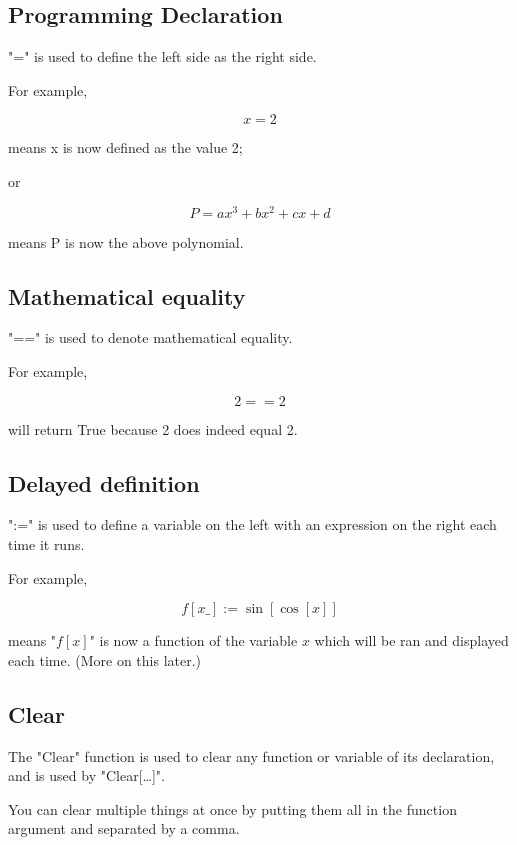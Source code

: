 \documentclass[11pt,letterpaper,twoside,titlepage]{report}
\begin{document}
					\subsection{Programming Declaration} %
					
						"=" is used to define the left side as the right side.
					
						For example, 
					
						\[ x = 2 \]
					
						means x is now defined as the value 2;
					
						or
					
						\[ P = ax^3 + bx^2 + cx + d \]
					
						means P is now the above polynomial.
						
					\subsection{Mathematical equality} %
					
						"==" is used to denote mathematical equality.
						
						For example,
						
						\[ 2 == 2 \]
							
						will return True because 2 does indeed equal 2.
						
					\subsection{Delayed definition}
							
						":=" is used to define a variable on the left with an expression on the right each time it runs.
						
						For example, 
						
						\[ f[x\_]:= \sin[\cos[x]] \]
						
						means "$f[x]$" is now a function of the variable $x$ which will be ran and displayed each time.  (More on this later.)
							
					\subsection{Clear}
						
						The "Clear" function is used to clear any function or variable of its declaration, and is used by "Clear[\dots]".
						
						You can clear multiple things at once by putting them all in the function argument and separated by a comma.
						
\end{document}
